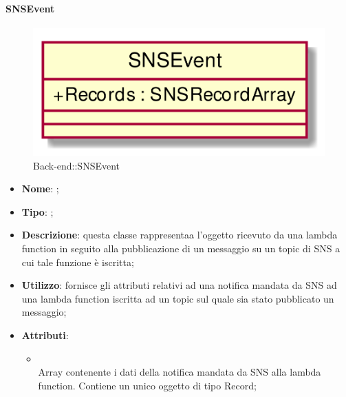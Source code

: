 \hypertarget{SNSEvent_label}{\paragraph{SNSEvent}}
\begin{figure}[h]
	\centering
	\includegraphics[width=\textwidth,height=\textheight,keepaspectratio]{images/ClassSNSEvent.png}
	\caption{Back-end::SNSEvent}
\end{figure}
\begin{itemize}
	\item \textbf{Nome}: ;
	\item \textbf{Tipo}: ;
	\item \textbf{Descrizione}: questa classe rappresentaa l'oggetto ricevuto da una lambda function in seguito alla pubblicazione di un messaggio su un topic di SNS a cui tale funzione è iscritta;
	\item \textbf{Utilizzo}: fornisce gli attributi relativi ad una notifica mandata da SNS ad una lambda function iscritta ad un topic sul quale sia stato pubblicato un messaggio;
	\item \textbf{Attributi}:
	\begin{itemize}
		\item[]  \\
		Array contenente i dati della notifica mandata da SNS alla lambda function. Contiene un unico oggetto di tipo Record;
	\end{itemize}
\end{itemize}
\FloatBarrier

